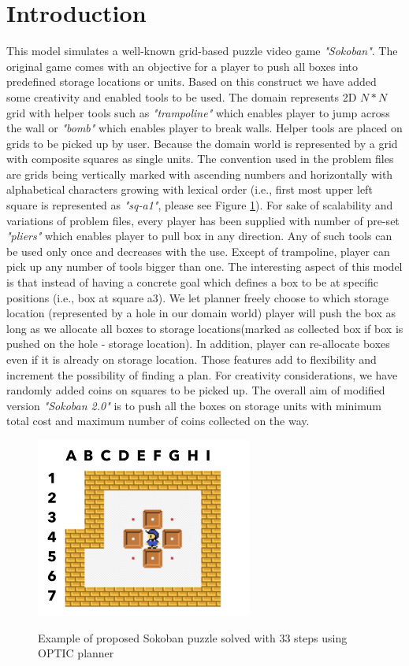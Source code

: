 \documentclass[letterpaper]{article} %
\begin{document}
\section{Introduction}
This model simulates a well-known grid-based puzzle video game \emph{"Sokoban"}. The original game comes with an objective for a player to push all boxes into predefined storage locations or units. Based on this construct we have added some creativity and enabled tools to be used. The domain represents 2D \(N*N\) grid with helper tools such as \emph{"trampoline"} which enables player to jump across the wall or \emph{"bomb"} which enables player to break walls. Helper tools are placed on grids to be picked up by user. Because the domain world is represented by a grid with composite squares as single units. The convention used in the problem files are grids being vertically marked with ascending numbers and horizontally with alphabetical characters growing with lexical order (i.e., first most upper left square is represented as \emph{"sq-a1"}, please see Figure \ref{fig:example}). For sake of scalability and variations of problem files, every player has been supplied with number of pre-set \emph{"pliers"} which enables player to pull box in any direction. Any of such tools can be used only once and decreases with the use. Except of trampoline, player can pick up any number of tools bigger than one. The interesting aspect of this model is that instead of having a concrete goal which defines a box to be at specific positions (i.e., box at square a3). We let planner freely choose to which storage location (represented by a hole in our domain world) player will push the box as long as we allocate all boxes to storage locations(marked as collected box if box is pushed on the hole - storage location). In addition, player can re-allocate boxes even if it is already on storage location. Those features add to flexibility and increment the possibility of finding a plan. For creativity considerations, we have randomly added coins on squares to be picked up. The overall aim of modified version \emph{"Sokoban 2.0"} is to push all the boxes on storage units with minimum total cost and maximum number of coins collected on the way.  
\begin{figure}
    \includegraphics[width=2.8in]{figure1.JPG} \\
    \caption{Example of proposed Sokoban puzzle solved with 33 steps using OPTIC planner}\label{fig:example}
\end{figure}
\end{document}
